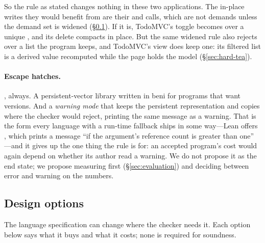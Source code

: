 So the rule as stated changes nothing in these two applications. The in-place writes they would
benefit from are their  and  calls, which are not
demands unless the demand set is widened (\S\ref{sec:disc-options}). If it is, TodoMVC's toggle becomes
 over a unique , and its delete compacts in place. But the same widened
rule also rejects  over a list the program keeps, and TodoMVC's view does keep one: its
filtered list is a derived value recomputed while the page holds the model (\S\ref{sec:hard-tea}).

\paragraph{Escape hatches.} , always. A persistent-vector library written in beni for
programs that want versions. And a \emph{warning mode} that keeps the persistent representation and
copies where the checker would reject, printing the same message as a warning. That is the form every
language with a run-time fallback ships in some way---Lean offers , which prints
a message ``if the argument's reference count is greater than one'' \citep{lean2025rc}---and it gives
up the one thing the rule is for: an accepted program's cost would again depend on whether its author
read a warning. We do not propose it as the end state; we propose measuring first
(\S\ref{sec:evaluation}) and deciding between error and warning on the numbers.

\subsection{Design options}
\label{sec:disc-options}

The language specification can change where the checker needs it. Each option below says what it buys
and what it costs; none is required for soundness.

